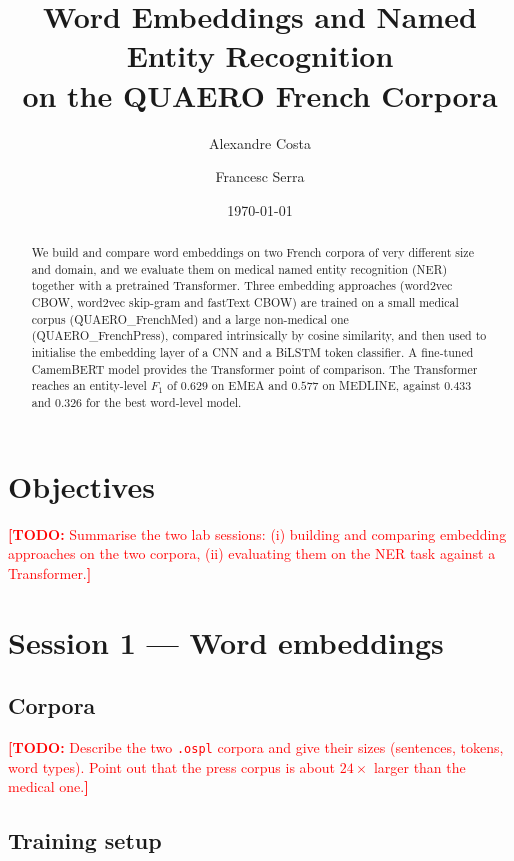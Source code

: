 \documentclass[11pt,a4paper]{article}
\title{Word Embeddings and Named Entity Recognition\\
       on the QUAERO French Corpora}
\author{Alexandre Costa \and Francesc Serra}
\date{\today}
\newcommand{\TODO}[1]{\textcolor{red}{\textbf{[TODO:} #1\textbf{]}}}
\begin{document}
\maketitle

\begin{abstract}
We build and compare word embeddings on two French corpora of very different size and domain,
and we evaluate them on medical named entity recognition (NER) together with a pretrained
Transformer. Three embedding approaches (word2vec CBOW, word2vec skip-gram and fastText CBOW)
are trained on a small medical corpus (QUAERO\_FrenchMed) and a large non-medical one
(QUAERO\_FrenchPress), compared intrinsically by cosine similarity, and then used to
initialise the embedding layer of a CNN and a BiLSTM token classifier. A fine-tuned
CamemBERT model provides the Transformer point of comparison. The Transformer reaches an
entity-level $F_1$ of $0.629$ on EMEA and $0.577$ on MEDLINE, against $0.433$ and $0.326$
for the best word-level model.
\end{abstract}

\section{Objectives}
\label{sec:objectives}

\TODO{Summarise the two lab sessions: (i) building and comparing embedding approaches on the
two corpora, (ii) evaluating them on the NER task against a Transformer.}

\section{Session 1 --- Word embeddings}
\label{sec:tp1}

\subsection{Corpora}
\label{sec:corpora}

\TODO{Describe the two \texttt{.ospl} corpora and give their sizes (sentences, tokens, word
types). Point out that the press corpus is about $24\times$ larger than the medical one.}

\subsection{Training setup}
\label{sec:tp1-setup}
\end{document}
